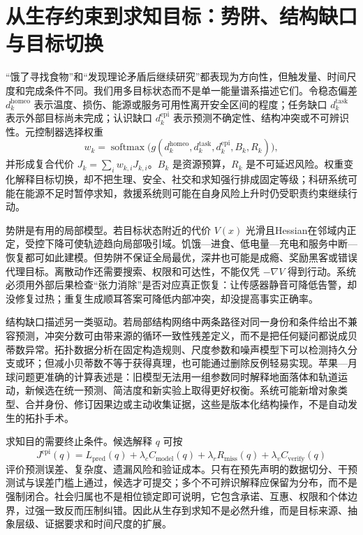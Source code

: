 \section{从生存约束到求知目标：势阱、结构缺口与目标切换}
\label{sec:section_6773}

“饿了寻找食物”和“发现理论矛盾后继续研究”都表现为方向性，但触发量、时间尺度和完成条件不同。我们用多目标状态而不是单一能量谱系描述它们。令稳态偏差 $d_k^{\mathrm{homeo}}$ 表示温度、损伤、能源或服务可用性离开安全区间的程度；任务缺口 $d_k^{\mathrm{task}}$ 表示外部目标尚未完成；认识缺口 $d_k^{\mathrm{epi}}$ 表示预测不确定性、结构冲突或不可辨识性。元控制器选择权重
\[
w_k=\operatorname{softmax}\bigl(g(d_k^{\mathrm{homeo}},d_k^{\mathrm{task}},d_k^{\mathrm{epi}},B_k,R_k)\bigr),
\]
并形成复合代价 $J_k=\sum_iw_{k,i}J_{k,i}$。$B_k$ 是资源预算，$R_k$ 是不可延迟风险。权重变化解释目标切换，却不把生理、安全、社交和求知强行排成固定等级；科研系统可能在能源不足时暂停求知，救援系统则可能在自身风险上升时仍受职责约束继续行动。

势阱是有用的局部模型。若目标状态附近的代价 $V(x)$ 光滑且Hessian在邻域内正定，受控下降可使轨迹趋向局部吸引域。饥饿—进食、低电量—充电和服务中断—恢复都可如此建模。但势阱不保证全局最优，深井也可能是成瘾、奖励黑客或错误代理目标。离散动作还需要搜索、权限和可达性，不能仅凭 $-\nabla V$ 得到行动。系统必须用外部后果检查“张力消除”是否对应真正恢复：让传感器静音可降低告警，却没修复过热；重复生成顺耳答案可降低内部冲突，却没提高事实正确率。

结构缺口描述另一类驱动。若局部结构网络中两条路径对同一身份和条件给出不兼容预测，冲突分数可由带来源的循环一致性残差定义，而不是把任何疑问都说成贝蒂数异常。拓扑数据分析在固定构造规则、尺度参数和噪声模型下可以检测持久分支或环；但减小贝蒂数不等于获得真理，也可能通过删除反例轻易实现。苹果—月球问题更准确的计算表述是：旧模型无法用一组参数同时解释地面落体和轨道运动，新候选在统一预测、简洁度和新实验上取得更好权衡。系统可能新增对象类型、合并身份、修订因果边或主动收集证据，这些是版本化结构操作，不是自动发生的拓扑手术。

求知目的需要终止条件。候选解释 $q$ 可按
\[
J^{\mathrm{epi}}(q)=L_{\mathrm{pred}}(q)+\lambda_cC_{\mathrm{model}}(q)
+\lambda_rR_{\mathrm{miss}}(q)+\lambda_vC_{\mathrm{verify}}(q)
\]
评价预测误差、复杂度、遗漏风险和验证成本。只有在预先声明的数据切分、干预测试与误差门槛上通过，候选才可提交；多个不可辨识解释应保留为分布，而不是强制闭合。社会归属也不是相位锁定即可说明，它包含承诺、互惠、权限和个体边界，过强一致反而压制纠错。因此从生存到求知不是必然升维，而是目标来源、抽象层级、证据要求和时间尺度的扩展。

